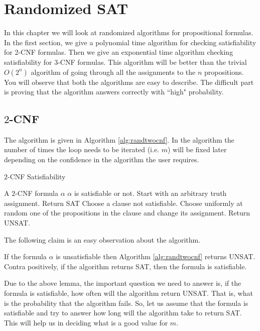 \newcommand{\expectation}[1]{E[#1]}

\chapter*{Randomized SAT}
In this chapter we will look at randomized algorithms for propositional formulas. In the first section, we give a polynomial time algorithm for checking satisfiability for 2-CNF formulas. Then we give an exponential time algorithm checking satisfiability for 3-CNF formulas. This algorithm will be better than the trivial $O(2^n)$ algorithm of going through all the assignments to the $n$ propositions. You will observe that both the algorithms are easy to describe. The difficult part is proving that the algorithm answers correctly with ``high" probability. 

\section{$2$-CNF}
The algorithm is given in Algorithm \ref{alg:randtwocnf}. In the algorithm the number of times the loop needs to be iterated (i.e. $m$) will be fixed later depending on the confidence in the algorithm the user requires.

\begin{algorithm}
 \caption{$2$-CNF Satisfiability}
 \label{alg:randtwocnf}
 \begin{algorithmic}[1]
 \renewcommand{\algorithmicrequire}{\textbf{Input:}}
 \renewcommand{\algorithmicensure}{\textbf{Output:}}
 \REQUIRE A $2$-CNF formula $\alpha$
 \ENSURE  $\alpha$ is satisfiable or not.
 \STATE Start with an arbitrary truth assignment.
 \STATE Return SAT
 \ENDIF
 \STATE Choose a clause not satisfiable.
 \STATE Choose uniformly at random one of the propositions in the clause and change its assignment.
 \ENDFOR
 \STATE Return UNSAT.
 \end{algorithmic} 
 \end{algorithm}
 
The following claim is an easy observation about the algorithm. 
\begin{lemma}
If the formula $\alpha$ is unsatisfiable then Algorithm \ref{alg:randtwocnf} returns UNSAT. Contra positively, if the algorithm returns SAT, then the formula is satisfiable.
\end{lemma}

Due to the above lemma, the important question we need to answer is, if the formula is satisfiable, how often will the algorithm return UNSAT. That is, what is the probability that the algorithm fails. So, let us assume that the formula is satisfiable and try to answer how long will the algorithm take to return SAT. This will help us in deciding what is a good value for $m$.  


